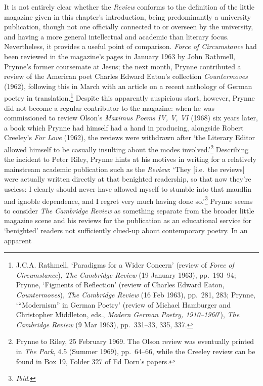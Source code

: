 \documentclass[]{article}
\begin{document}
It is not entirely clear whether the \emph{Review} conforms to the
definition of the little magazine given in this chapter’s introduction,
being predominantly a university publication, though not one officially
connected to or overseen by the university, and having a more general
intellectual and academic than literary focus. Nevertheless, it provides
a useful point of comparison. \emph{Force of Circumstance} had been
reviewed in the magazine’s pages in January 1963 by John Rathmell,
Prynne’s former coursemate at Jesus; the next month, Prynne contributed
a review of the American poet Charles Edward Eaton’s collection
\emph{Countermoves} (1962), following this in March with an article on a
recent anthology of German poetry in translation.\footnote{J.C.A.
  Rathmell, ‘Paradigms for a Wider Concern’ (review of \emph{Force of
  Circumstance}), \emph{The Cambridge Review} (19 January 1963),
  pp.~193–94; Prynne, ‘Figments of Reflection’ (review of Charles Edward
  Eaton, \emph{Countermoves}), \emph{The Cambridge Review} (16 Feb
  1963), pp.~281, 283; Prynne, ‘“Modernism” in German Poetry’ (review of
  Michael Hamburger and Christopher Middleton, eds., \emph{Modern German
  Poetry, 1910–1960}’), \emph{The Cambridge Review} (9 Mar 1963),
  pp.~331–33, 335, 337.} Despite this apparently auspicious start,
however, Prynne did not become a regular contributor to the magazine:
when he was commissioned to review Olson’s \emph{Maximus Poems IV, V,
VI} (1968) six years later, a book which Prynne had himself had a hand
in producing, alongside Robert Creeley’s \emph{For Love} (1962), the
reviews were withdrawn after ‘the Literary Editor allowed himself to be
casually insulting about the modes involved.’\footnote{Prynne to Riley,
  25 February 1969. The Olson review was eventually printed in \emph{The
  Park}, 4.5 (Summer 1969), pp.~64–66, while the Creeley review can be
  found in Box 19, Folder 327 of Ed Dorn’s papers.} Describing the
incident to Peter Riley, Prynne hints at his motives in writing for a
relatively mainstream academic publication such as the \emph{Review}:
‘They {[}i.e.~the reviews{]} were actually written directly at that
benighted readership, so that now they’re useless: I clearly should
never have allowed myself to stumble into that maudlin and ignoble
dependence, and I regret very much having done so.’\footnote{\emph{Ibid}.}
Prynne seems to consider \emph{The Cambridge Review} as something
separate from the broader little magazine scene and his reviews for the
publication as an educational service for ‘benighted’ readers not
sufficiently clued-up about contemporary poetry. In an apparent
\end{document}
